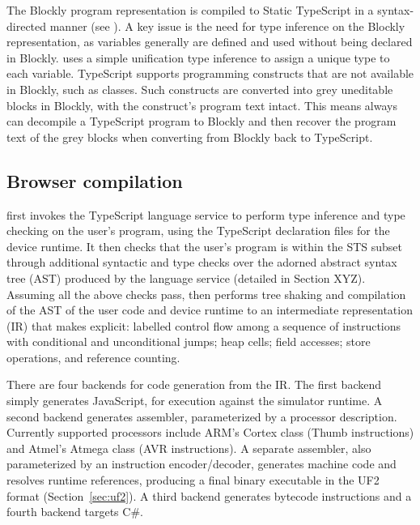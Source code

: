 {The Blockly program representation is compiled to Static TypeScript in a syntax-directed manner
(see \emph{}). A key issue 
is the need for type inference on the Blockly representation, as variables generally are defined and used without
being declared in Blockly. \MC uses a simple unification type inference to assign a
unique type to each variable.  
TypeScript supports programming constructs that are not available in Blockly, such as classes.
Such constructs are converted into grey uneditable blocks in Blockly, with the construct's program
text intact. This means \MC always can decompile a TypeScript program to Blockly and then recover
the program text of the grey blocks when converting from Blockly back to TypeScript.

\subsection{Browser compilation}

\MC first invokes the TypeScript language service to perform type inference and type checking on the 
user's program, using the TypeScript declaration files for the device runtime.   It then checks that the
user's program is within the STS subset through additional syntactic and type checks over the adorned
abstract syntax tree (AST) produced by the language service (detailed in Section XYZ).  Assuming all the
above checks pass, \MC then performs tree shaking and compilation of the AST of the user code and
device runtime to an intermediate representation (IR) that makes explicit: labelled control flow among a
sequence of instructions with conditional and unconditional jumps; heap cells; field accesses; store operations,
and reference counting.

There are four backends for code generation from the IR. The first backend simply generates JavaScript,
for execution against the simulator runtime.  A second backend generates assembler, parameterized by a
processor description.  Currently supported processors include ARM's Cortex class (Thumb instructions)
and Atmel's Atmega class (AVR instructions). A separate assembler, also parameterized by an instruction
encoder/decoder, generates machine code and resolves runtime references, producing a final binary executable
in the UF2 format (Section~\ref{sec:uf2}).
A third backend generates bytecode instructions and a fourth backend targets C\#. 


}
